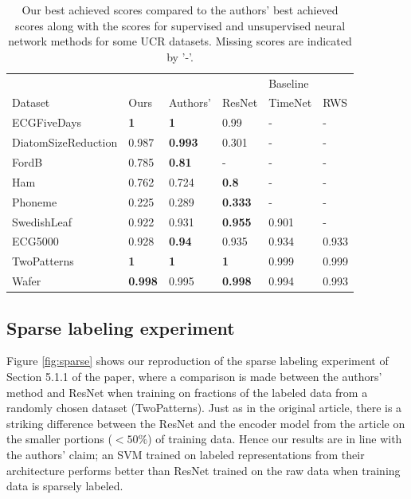 \documentclass{article}
\begin{document}
\begin{table}[h!]
\setlength{\tabcolsep}{7.5pt}
\caption{Our best achieved scores compared to the authors' best achieved scores along with the scores for supervised and unsupervised neural network methods for some UCR datasets. Missing scores are indicated by '-'.}
\label{tab:table1nn}
\centering
\begin{tabular}{llllll}
\hline
                    &                &                &\vrule & Baseline \\

Dataset             & Ours           & Authors'       &\vrule ResNet         & TimeNet & RWS   \\
\hline
ECGFiveDays         & \textbf{1}          & \textbf{1}     & 0.99           & -       & -     \\
DiatomSizeReduction & 0.987 & \textbf{0.993} & 0.301          & -       & -     \\
FordB               & 0.785          & \textbf{0.81}  & -              & -       & -     \\
Ham                 & 0.762          & 0.724          & \textbf{0.8}   & -       & -     \\
Phoneme             & 0.225           & 0.289          & \textbf{0.333} & -       & -     \\
SwedishLeaf         & 0.922          & 0.931          & \textbf{0.955} & 0.901   & -    \\ \hdashline
ECG5000             & 0.928          & \textbf{0.94} & 0.935          & 0.934   & 0.933 \\
TwoPatterns         & \textbf{1}     & \textbf{1}     & \textbf{1}     & 0.999   & 0.999 \\
Wafer               & \textbf{0.998}          & 0.995 & \textbf{0.998} & 0.994   & 0.993  

\end{tabular}
\end{table}
\newpage
\subsection{Sparse labeling experiment}

Figure \ref{fig:sparse} shows our reproduction of the sparse labeling experiment of Section 5.1.1 of the paper, where a comparison is made between the authors' method and ResNet when training on fractions of the labeled data from a randomly chosen dataset (TwoPatterns). Just as in the original article, there is a striking difference between the ResNet and the encoder model from the article on the smaller portions ($<50\%$) of training data. Hence our results are in line with the authors' claim; an SVM trained on labeled representations from their architecture performs better than ResNet trained on the raw data when training data is sparsely labeled.
\end{document}
